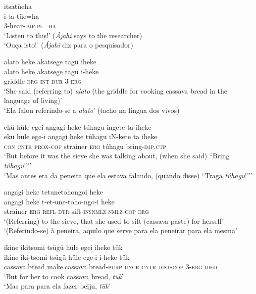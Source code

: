 \documentclass[output=paper,
modfonts,nonflat
]{langsci/langscibook}
\begin{document}
\ea itsatüeha \\[.3em]
\gll i-ta-tüe=ha \\
3-hear-\textsc{imp.pl=ha} \\
\glt ‘Listen to this!’ (\textit{Ájahi} says to the researcher) \\
‘Ouça isto!’ (\textit{Ájahi} diz para o pesquisador) \\
\z

 
\ea alato heke akatsege tagü iheke \\[.3em]
\gll alato heke akatsege tagü i-heke \\
griddle \textsc{erg} \textsc{int} \textsc{dur} 3-\textsc{erg} \\
\glt ‘She said (referring to) \emph{alato} (the griddle for cooking cassava bread in the language of living)’ \\
‘Ela falou referindo-se a \emph{alato}’ (tacho na língua dos vivos)  \\
\z

\ea ekü hüle egei angagi heke túhagu ingete ta iheke \\[.3em]
\gll ekü hüle ege-i angagi heke túhagu iN-kete ta iheke \\
\textsc{con} \textsc{cntr} \textsc{prox-cop} strainer \textsc{erg} túhagu bring-\textsc{imp.ctp} \\
\glt ‘But before it was the sieve she was talking about, (when she said) “Bring \emph{túhagu}!”’ \\
‘Mas antes era da peneira que ela estava falando, (quando disse) “Traga \emph{túhagu}!”’ \\
\z

\ea angagi heke tetunetohongoi heke \\[.3em]
\gll angagi heke	t-et-une-toho-ngo-i				heke \\
strainer \textsc{erg}	\textsc{refl-dtr}-sift-\textsc{insnmlz-nmlz-cop}	\textsc{erg} \\
\glt ‘(Referring) to the sieve, that she used to sift (cassava paste) for herself’ \\
‘(Referindo-se) à peneira, aquilo que serve para ela peneirar para ela mesma’ \\
\z

\ea ikine ikitsomi tsügü hüle egei iheke tük \\[.3em]
\gll ikine		iki-tsomi			tsügü		hüle	ege-i		i-heke	tük \\
cassava.bread	make.cassava.bread-\textsc{purp} 	\textsc{uncr}	\textsc{cntr} 	\textsc{dist-cop} 	3-\textsc{erg}	\textsc{ideo} \\
\glt ‘But for her to cook cassava bread, \textit{tük}’ \\
‘Mas para para ela fazer beiju, \textit{tük}’ \\
\z
\end{document}
